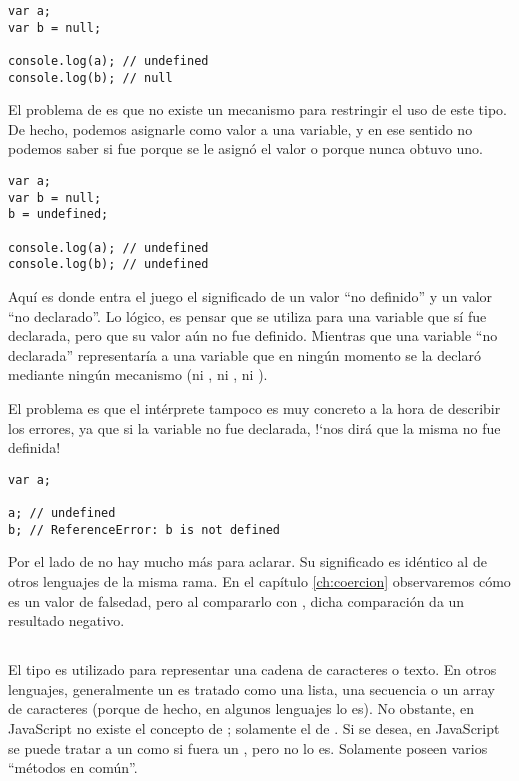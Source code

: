 \begin{lstlisting}[title={\code{null} y \code{undefined}}]
var a;
var b = null;

console.log(a);	// undefined
console.log(b);	// null
\end{lstlisting}

El problema de  es que no existe un mecanismo para restringir el uso de este tipo. De hecho, podemos asignarle  como valor a una variable, y en ese sentido no podemos saber si fue porque se le asignó el valor o porque nunca obtuvo uno.

\begin{lstlisting}
var a;
var b = null;
b = undefined;

console.log(a);	// undefined
console.log(b);	// undefined
\end{lstlisting}

Aquí es donde entra el juego el significado de un valor "`no definido"' y un valor "`no declarado"'. Lo lógico, es pensar que  se utiliza para una variable que sí fue declarada, pero que su valor aún no fue definido. Mientras que una variable "`no declarada"' representaría a una variable que en ningún momento se la declaró mediante ningún mecanismo (ni , ni , ni ).

El problema es que el intérprete tampoco es muy concreto a la hora de describir los errores, ya que si la variable no fue declarada, !`nos dirá que la misma no fue definida!

\begin{lstlisting}
var a;

a; // undefined
b; // ReferenceError: b is not defined
\end{lstlisting}

Por el lado de  no hay mucho más para aclarar. Su significado es idéntico al de otros lenguajes de la misma rama. En el capítulo \ref{ch:coercion} observaremos cómo  es un valor de falsedad, pero al compararlo con , dicha comparación da un resultado negativo.

\subsection{}

El tipo  es utilizado para representar una cadena de caracteres o texto. En otros lenguajes, generalmente un  es tratado como una lista, una secuencia o un array de caracteres (porque de hecho, en algunos lenguajes lo es). No obstante, en JavaScript no existe el concepto de ; solamente el de . Si se desea, en JavaScript se puede tratar a un  como si fuera un , pero no lo es. Solamente poseen varios "`métodos en común"'.

